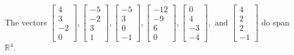 \begin{exercise}
\begin{exerciseStatement}
  \end{exerciseStatement}
  \begin{exerciseAnswer}
   The vectors \(\left[\begin{array}{r}
4 \\
3 \\
-2 \\
0
\end{array}\right] , \left[\begin{array}{r}
-5 \\
-2 \\
3 \\
1
\end{array}\right] , \left[\begin{array}{r}
-5 \\
3 \\
0 \\
-1
\end{array}\right] , \left[\begin{array}{r}
-12 \\
-9 \\
6 \\
0
\end{array}\right] , \left[\begin{array}{r}
0 \\
4 \\
-3 \\
-4
\end{array}\right] , \text{ and } \left[\begin{array}{r}
4 \\
2 \\
2 \\
-1
\end{array}\right]\) 
  	 do  
	span \(\mathbb{R}^4\).
  


  \end{exerciseAnswer}
\end{exercise}